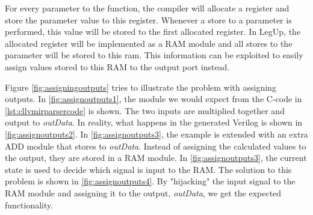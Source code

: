 For every parameter to the function, the compiler will allocate a register and store the parameter value to this register. Whenever a store to a parameter is performed, this value will be stored to the first allocated register. In LegUp, the allocated register will be implemented as a RAM module and all stores to the parameter will be stored to this ram. This information can be exploited to easily assign values stored to this RAM to the output port instead.

Figure \ref{fig:assigningoutputs} tries to illustrate the problem with assigning outputs. In \cref{fig:assignoutputs1}, the module we would expect from the C-code in \cref{lst:cllvmirparsercode} is shown. The two inputs are multiplied together and output to \textit{outData}. In reality, what happens in the generated Verilog is shown in \cref{fig:assignoutputs2}. In \cref{fig:assignoutputs3}, the example is extended with an extra ADD module that stores to \textit{outData}. Instead of assigning the calculated values to the output, they are stored in a RAM module. In \cref{fig:assignoutputs3}, the current state is used to decide which signal is input to the RAM. The solution to this problem is shown in \cref{fig:assignoutputs4}. By "hijacking" the input signal to the RAM module and assigning it to the output, \textit{outData}, we get the expected functionality. 
